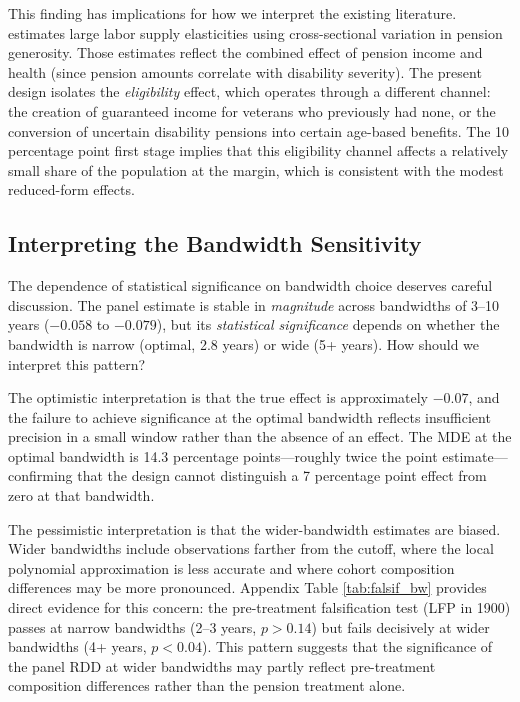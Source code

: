 \documentclass[12pt]{article}
\begin{document}
This finding has implications for how we interpret the existing literature. \citet{costa1995pensions} estimates large labor supply elasticities using cross-sectional variation in pension generosity. Those estimates reflect the combined effect of pension income and health (since pension amounts correlate with disability severity). The present design isolates the \textit{eligibility} effect, which operates through a different channel: the creation of guaranteed income for veterans who previously had none, or the conversion of uncertain disability pensions into certain age-based benefits. The 10 percentage point first stage implies that this eligibility channel affects a relatively small share of the population at the margin, which is consistent with the modest reduced-form effects.

\subsection{Interpreting the Bandwidth Sensitivity}

The dependence of statistical significance on bandwidth choice deserves careful discussion. The panel estimate is stable in \textit{magnitude} across bandwidths of 3--10 years ($-0.058$ to $-0.079$), but its \textit{statistical significance} depends on whether the bandwidth is narrow (optimal, 2.8 years) or wide (5+ years). How should we interpret this pattern?

The optimistic interpretation is that the true effect is approximately $-0.07$, and the failure to achieve significance at the optimal bandwidth reflects insufficient precision in a small window rather than the absence of an effect. The MDE at the optimal bandwidth is 14.3 percentage points---roughly twice the point estimate---confirming that the design cannot distinguish a 7 percentage point effect from zero at that bandwidth.

The pessimistic interpretation is that the wider-bandwidth estimates are biased. Wider bandwidths include observations farther from the cutoff, where the local polynomial approximation is less accurate and where cohort composition differences may be more pronounced. Appendix Table \ref{tab:falsif_bw} provides direct evidence for this concern: the pre-treatment falsification test (LFP in 1900) passes at narrow bandwidths (2--3 years, $p > 0.14$) but fails decisively at wider bandwidths (4+ years, $p < 0.04$). This pattern suggests that the significance of the panel RDD at wider bandwidths may partly reflect pre-treatment composition differences rather than the pension treatment alone.
\end{document}
